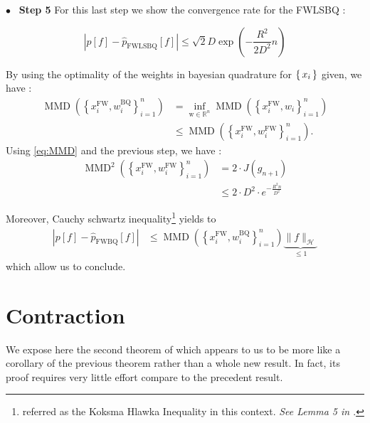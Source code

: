   {$\bullet$~\normalfont\bfseries\color{myorange!90!black} Step 5 }
For this last step we show the convergence rate for the FWLSBQ :
\begin{boxtheorem}
  \begin{equation}
    \left| p [ f ] - \hat { p } _ { \mathrm { FWLSBQ } } [ f ] \right| \leq
    \sqrt { 2 } D \exp \left( - \frac { R ^ { 2 } } { 2 D ^ { 2 } } n \right)
  \end{equation}
\end{boxtheorem}

By using the optimality of the weights in bayesian quadrature for $\left \{ \, x_i \, \right \}$ given,
 we have :
 \begin{align*}
   \operatorname { MMD } \left( \left\{ x _ { i } ^ { \mathrm { FW } } , w _ { i } ^ { \mathrm { BQ } } \right\} _ { i = 1 } ^ { n } \right) &= \inf _ { \mathrm { w } \in \mathbb { R } ^ { n } } \operatorname { MMD } \left( \left\{ x _ { i } ^ { \mathrm { FW } } , w _ { i } \right\} _ { i = 1 } ^ { n } \right) \\
   & \leq \operatorname { MMD } \left( \left\{ x _ { i } ^ { \mathrm { FW } } , w _ { i } ^ { \mathrm { FW } } \right\} _ { i = 1 } ^ { n } \right).
 \end{align*}
Using \eqref{eq:MMD} and the previous step, we have :
\begin{align*}
  \operatorname { MMD } ^ { 2 } \left( \left\{ x _ { i } ^ { \mathrm { FW } } , w _ { i } ^ { \mathrm { FW } } \right\} _ { i = 1 } ^ { n } \right)
  &= 2 \cdot J(g_{n+1}) \\
  &\leq 2 \cdot D ^ { 2 } \cdot e ^ { - \frac { R ^ { 2 } n } { D ^ { 2 } } }
\end{align*}

Moreover, Cauchy schwartz inequality\footnote{referred as the Koksma Hlawka Inequality in this context. \textit{See Lemma 5 in \cite{Chen}}.} yields to
\begin{align*}
  \left| p [ f ] - \hat { p } _ { \mathrm { FWBQ } } [ f ] \right| &\leq \operatorname { MMD } \left( \left\{ x _ { i } ^ { \mathrm { FW } } , w _ { i } ^ { \mathrm { BQ } } \right\} _ { i = 1 } ^ { n } \right) \underbrace{\| f \| _ { \mathcal { H }}
   }_{\leq 1}
\end{align*}
which allow us to conclude.
\section{Contraction}
\label{sec:contraction}

We expose here the second theorem of \cite{FWBQ} which appears to us to be more
 like a corollary of the previous theorem rather than a whole new result. In fact,
 its proof requires very little effort compare to the precedent result.

